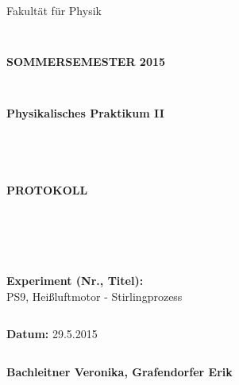 \documentclass[12pt,a4paper,twopage]{article}
\begin{document}
\thispagestyle{empty}
			\begin{center}
			\Large{Fakultät für Physik}\\
			\end{center}
\begin{verbatim}


\end{verbatim}
			\begin{center}
			\textbf{\LARGE SOMMERSEMESTER 2015}
			\end{center}
\begin{verbatim}


\end{verbatim}
			\begin{center}
			\textbf{\LARGE{Physikalisches Praktikum II}}
			\end{center}
\begin{verbatim}




\end{verbatim}

			\begin{center}
			\textbf{\LARGE{PROTOKOLL}}
			\end{center}
			
\begin{verbatim}





\end{verbatim}

			\begin{flushleft}
			\textbf{\Large{Experiment (Nr., Titel):}}\\
			PS9, Heißluftmotor - Stirlingprozess
			\LARGE{}	
			\end{flushleft}

\begin{verbatim}

\end{verbatim}	
			\begin{flushleft}
			\textbf{\Large{Datum:}} \Large{29.5.2015}
			\end{flushleft}
			
\begin{verbatim}
\end{verbatim}
		\begin{flushleft}
			\textbf{\Large{Bachleitner Veronika, Grafendorfer Erik}} 
			\end{flushleft}
\end{document}
